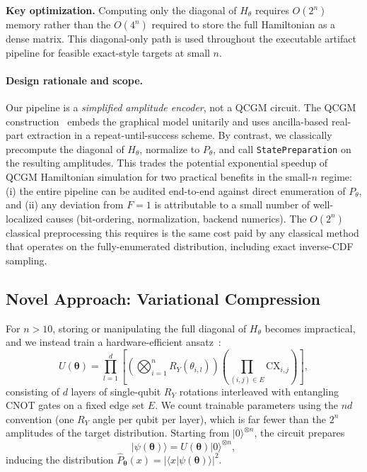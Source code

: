 \documentclass[conference,10pt]{IEEEtran}
\begin{document}
\textbf{Key optimization.} Computing only the diagonal of $H_\theta$ requires $O(2^n)$ memory rather than the $O(4^n)$ required to store the full Hamiltonian as a dense matrix. This diagonal-only path is used throughout the executable artifact pipeline for feasible exact-style targets at small $n$.

\paragraph{Design rationale and scope.} Our pipeline is a \emph{simplified amplitude encoder}, not a QCGM circuit. The QCGM construction~\cite{piatkowski2024qcgms} embeds the graphical model unitarily and uses ancilla-based real-part extraction in a repeat-until-success scheme. By contrast, we classically precompute the diagonal of $H_\theta$, normalize to $P_\theta$, and call \texttt{StatePreparation} on the resulting amplitudes. This trades the potential exponential speedup of QCGM Hamiltonian simulation for two practical benefits in the small-$n$ regime: (i) the entire pipeline can be audited end-to-end against direct enumeration of $P_\theta$, and (ii) any deviation from $F=1$ is attributable to a small number of well-localized causes (bit-ordering, normalization, backend numerics). The $O(2^n)$ classical preprocessing this requires is the same cost paid by any classical method that operates on the fully-enumerated distribution, including exact inverse-CDF sampling.

\subsection{Novel Approach: Variational Compression}

For $n > 10$, storing or manipulating the full diagonal of $H_\theta$ becomes impractical, and we instead train a hardware-efficient ansatz~\cite{kandala2017hardware}:
\begin{equation}
U(\boldsymbol{\theta}) = \prod_{l=1}^{d}\!\left[\!\left(\bigotimes_{i=1}^{n} R_Y(\theta_{i,l})\right)\!\left(\prod_{(i,j)\in E}\!\mathrm{CX}_{i,j}\right)\!\right]\!,
\end{equation}
consisting of $d$ layers of single-qubit $R_Y$ rotations interleaved with entangling CNOT gates on a fixed edge set $E$. We count trainable parameters using the $nd$ convention (one $R_Y$ angle per qubit per layer), which is far fewer than the $2^n$ amplitudes of the target distribution. Starting from $|0\rangle^{\otimes n}$, the circuit prepares
\[
|\psi(\boldsymbol{\theta})\rangle = U(\boldsymbol{\theta})|0\rangle^{\otimes n},
\]
inducing the distribution $\hat{P}_{\boldsymbol{\theta}}(x) = |\langle x|\psi(\boldsymbol{\theta})\rangle|^2$.
\end{document}
